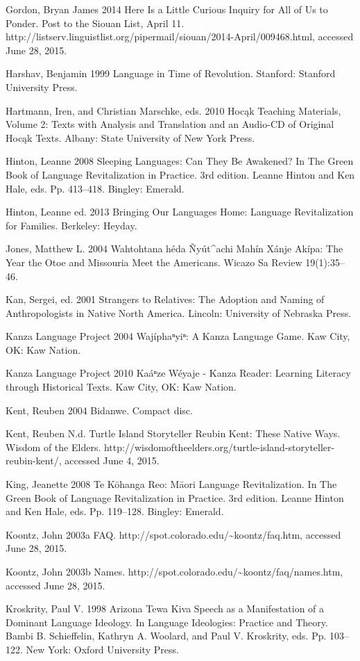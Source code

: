 \documentclass[output=paper]{LSP/langsci}
\begin{document}
\begin{reflist}
Gordon, Bryan James 2014 Here Is a Little Curious Inquiry for All of Us to Ponder. Post to the Siouan List, April 11. http://listserv.linguistlist.org/pipermail/siouan/2014-April/009468.html, accessed June 28, 2015.

Harshav, Benjamin 1999 Language in Time of Revolution. Stanford: Stanford University Press.

Hartmann, Iren, and Christian Marschke, eds. 2010 Hoc\k{a}k Teaching Materials, Volume 2: Texts with Analysis and Translation and an Audio-CD of Original Hoc\k{a}k Texts. Albany: State University of New York Press.

Hinton, Leanne 2008 Sleeping Languages: Can They Be Awakened? In The Green Book of Language Revitalization in Practice. 3rd edition. Leanne Hinton and Ken Hale, eds. Pp. 413--418. Bingley: Emerald.

Hinton, Leanne  ed. 2013 Bringing Our Languages Home: Language Revitalization for Families. Berkeley: Heyday.

Jones, Matthew L. 2004 Wahtohtana héda \~Nyút\^{ }achi Mahín Xánje Akípa: The Year the Otoe and Missouria Meet the Americans. Wicazo Sa Review 19(1):35--46.

Kan, Sergei, ed. 2001 Strangers to Relatives: The Adoption and Naming of Anthropologists in Native North America. Lincoln: University of Nebraska Press.

Kanza Language Project 2004 Wajíphaⁿyiⁿ: A Kanza Language Game. Kaw City, OK: Kaw Nation.

Kanza Language Project 2010 Kaáⁿze Wéyaje - Kanza Reader: Learning Literacy through Historical Texts. Kaw City, OK: Kaw Nation.

Kent, Reuben 2004 Bidanwe. Compact disc.

Kent, Reuben N.d. Turtle Island Storyteller Reubin Kent: These Native Ways. Wisdom of the Elders. http://wisdomoftheelders.org/turtle-island-storyteller-reubin-kent/, accessed June 4, 2015.

King, Jeanette 2008 Te K\=ohanga Reo: M\=aori Language Revitalization. In The Green Book of Language Revitalization in Practice. 3rd edition. Leanne Hinton and Ken Hale, eds. Pp. 119--128. Bingley: Emerald.

Koontz, John 2003a FAQ. http://spot.colorado.edu/\textasciitilde koontz/faq.htm, accessed June 28, 2015.

Koontz, John 2003b Names. http://spot.colorado.edu/\textasciitilde koontz/faq/names.htm, accessed June 28, 2015.

Kroskrity, Paul V. 1998 Arizona Tewa Kiva Speech as a Manifestation of a Dominant Language Ideology. In Language Ideologies: Practice and Theory. Bambi B. Schieffelin, Kathryn A. Woolard, and Paul V. Kroskrity, eds. Pp. 103--122. New York: Oxford University Press.


\end{reflist}
\end{document}
